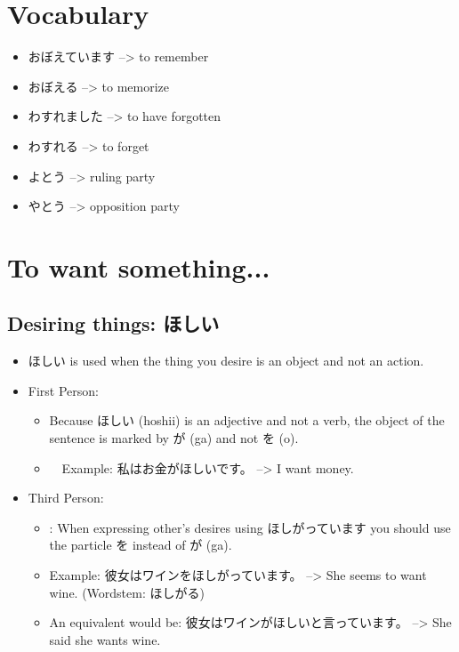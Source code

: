\documentclass{article}
\begin{document}
\section{Vocabulary}
\begin{itemize}
\item おぼえています --> to remember
\item おぼえる --> to memorize
\item わすれました --> to have forgotten
\item わすれる --> to forget
\item よとう --> ruling party
\item やとう --> opposition party
\end{itemize}
\section{To want something...}
\subsection{Desiring things: ほしい}
\begin{itemize}
\item ほしい is used when the thing you desire is an object and not an action.
\item First Person:
\begin{itemize}
\item Because ほしい (hoshii) is an adjective and not a verb, the object of the sentence is marked by が (ga) and not を (o).
\item　Example: 私はお金がほしいです。 --> I want money.
\end{itemize}
\item Third Person:
\begin{itemize}
\item: When expressing other’s desires using ほしがっています you should use the particle を instead of が (ga).
\item Example: 彼女はワインをほしがっています。	 --> She seems to want wine.	(Wordstem: ほしがる)
\item An equivalent would be: 彼女はワインがほしいと言っています。 --> She said she wants wine.
\end{itemize}
\end{itemize}
\end{document}
